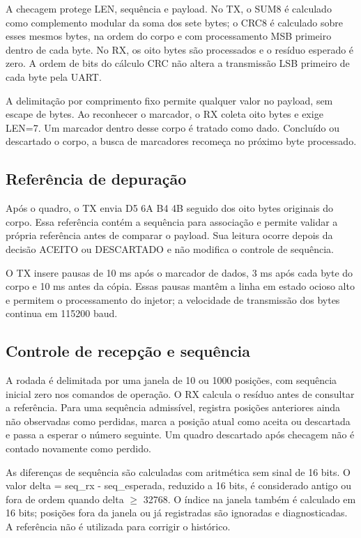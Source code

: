 \documentclass[12pt,a4paper]{article}
\begin{document}
A checagem protege LEN, sequência e payload. No TX, o SUM8 é calculado como complemento modular da soma dos sete bytes; o CRC8 é calculado sobre esses mesmos bytes, na ordem do corpo e com processamento MSB primeiro dentro de cada byte. No RX, os oito bytes são processados e o resíduo esperado é zero. A ordem de bits do cálculo CRC não altera a transmissão LSB primeiro de cada byte pela UART.

A delimitação por comprimento fixo permite qualquer valor no payload, sem escape de bytes. Ao reconhecer o marcador, o RX coleta oito bytes e exige LEN=7. Um marcador dentro desse corpo é tratado como dado. Concluído ou descartado o corpo, a busca de marcadores recomeça no próximo byte processado.

\subsection{Referência de depuração}
Após o quadro, o TX envia D5 6A B4 4B seguido dos oito bytes originais do corpo. Essa referência contém a sequência para associação e permite validar a própria referência antes de comparar o payload. Sua leitura ocorre depois da decisão ACEITO ou DESCARTADO e não modifica o controle de sequência.

O TX insere pausas de 10 ms após o marcador de dados, 3 ms após cada byte do corpo e 10 ms antes da cópia. Essas pausas mantêm a linha em estado ocioso alto e permitem o processamento do injetor; a velocidade de transmissão dos bytes continua em 115200 baud.

\FloatBarrier
\subsection{Controle de recepção e sequência}
A rodada é delimitada por uma janela de 10 ou 1000 posições, com sequência inicial zero nos comandos de operação. O RX calcula o resíduo antes de consultar a referência. Para uma sequência admissível, registra posições anteriores ainda não observadas como perdidas, marca a posição atual como aceita ou descartada e passa a esperar o número seguinte. Um quadro descartado após checagem não é contado novamente como perdido.

As diferenças de sequência são calculadas com aritmética sem sinal de 16 bits. O valor delta = seq\_rx - seq\_esperada, reduzido a 16 bits, é considerado antigo ou fora de ordem quando delta \ensuremath{\geq} 32768. O índice na janela também é calculado em 16 bits; posições fora da janela ou já registradas são ignoradas e diagnosticadas. A referência não é utilizada para corrigir o histórico.
\end{document}

